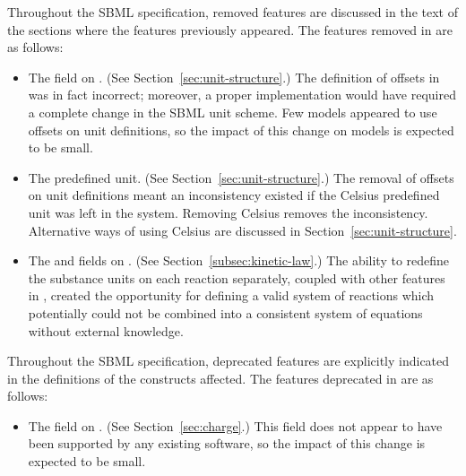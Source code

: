 Throughout the SBML specification, removed features are discussed
in the text of the sections where the features previously appeared.
The features removed in \changed{\sbmltwothree} are as follows:
\begin{itemize}
  
\item The  field on \UnitDefinition.  (See
  Section~\ref{sec:unit-structure}.)  The definition of offsets in
  \sbmltwoone was in fact incorrect; moreover, a proper
  implementation would have required a complete change in the SBML
  unit scheme.  Few models appeared to use offsets on unit
  definitions, so the impact of this change on models is expected
  to be small.
  
\item The  predefined unit.  (See
  Section~\ref{sec:unit-structure}.)  The removal of offsets on
  unit definitions meant an inconsistency existed if the Celsius
  predefined unit was left in the system.  Removing Celsius
  removes the inconsistency.  Alternative ways of using Celsius
  are discussed in Section~\ref{sec:unit-structure}.
  
\item The  and  fields on
  \KineticLaw.  (See Section~\ref{subsec:kinetic-law}.)  The
  ability to redefine the substance units on each reaction
  separately, coupled with other features in \sbmltwotwo, created
  the opportunity for defining a valid system of reactions which
  potentially could not be combined into a consistent system of
  equations without external knowledge.

\end{itemize}
Throughout the SBML specification, deprecated features are
explicitly indicated in the definitions of the constructs
affected.  The features deprecated in \sbmltwotwo are as follows:
\begin{itemize}
  
\item The  field on \Species.  (See
  Section~\ref{sec:charge}.)  This field does not appear to have
  been supported by any existing software, so the impact of this
  change is expected to be small.

\end{itemize}

